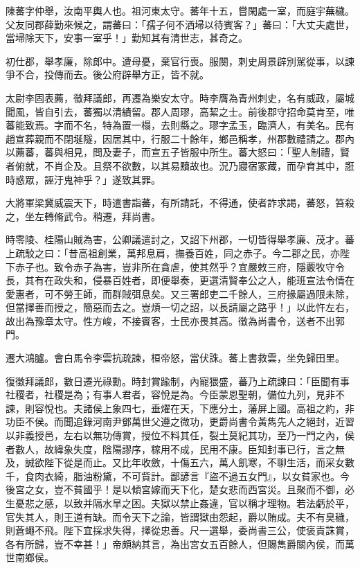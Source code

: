
\begin{pinyinscope}
陳蕃字仲舉，汝南平輿人也。祖河東太守。蕃年十五，嘗閑處一室，而庭宇蕪穢。父友同郡薛勤來候之，謂蕃曰：「孺子何不洒埽以待賓客？」蕃曰：「大丈夫處世，當埽除天下，安事一室乎！」勤知其有清世志，甚奇之。

初仕郡，舉孝廉，除郎中。遭母憂，棄官行喪。服闋，刺史周景辟別駕從事，以諫爭不合，投傳而去。後公府辟舉方正，皆不就。

太尉李固表薦，徵拜議郎，再遷為樂安太守。時李膺為青州刺史，名有威政，屬城聞風，皆自引去，蕃獨以清績留。郡人周璆，高絜之士。前後郡守招命莫肯至，唯蕃能致焉。字而不名，特為置一榻，去則縣之。璆字孟玉，臨濟人，有美名。民有趙宣葬親而不閉埏隧，因居其中，行服二十餘年，鄉邑稱孝，州郡數禮請之。郡內以薦蕃，蕃與相見，問及妻子，而宣五子皆服中所生。蕃大怒曰：「聖人制禮，賢者俯就，不肖企及。且祭不欲數，以其易黷故也。況乃寢宿冢藏，而孕育其中，誑時惑眾，誣汙鬼神乎？」遂致其罪。

大將軍梁冀威震天下，時遣書詣蕃，有所請託，不得通，使者詐求謁，蕃怒，笞殺之，坐左轉脩武令。稍遷，拜尚書。

時零陵、桂陽山賊為害，公卿議遣討之，又詔下州郡，一切皆得舉孝廉、茂才。蕃上疏駮之曰：「昔高祖創業，萬邦息肩，撫養百姓，同之赤子。今二郡之民，亦陛下赤子也。致令赤子為害，豈非所在貪虐，使其然乎？宜嚴敕三府，隱覈牧守令長，其有在政失和，侵暴百姓者，即便舉奏，更選清賢奉公之人，能班宣法令情在愛惠者，可不勞王師，而群賊弭息矣。又三署郎吏二千餘人，三府掾屬過限未除，但當擇善而授之，簡惡而去之。豈煩一切之詔，以長請屬之路乎！」以此忤左右，故出為豫章太守。性方峻，不接賓客，士民亦畏其高。徵為尚書令，送者不出郭門。

遷大鴻臚。會白馬令李雲抗疏諫，桓帝怒，當伏誅。蕃上書救雲，坐免歸田里。

復徵拜議郎，數日遷光祿勳。時封賞踰制，內寵猥盛，蕃乃上疏諫曰：「臣聞有事社稷者，社稷是為；有事人君者，容悅是為。今臣蒙恩聖朝，備位九列，見非不諫，則容悅也。夫諸侯上象四七，垂燿在天，下應分土，藩屏上國。高祖之約，非功臣不侯。而聞追錄河南尹鄧萬世父遵之微功，更爵尚書令黃雋先人之絕封，近習以非義授邑，左右以無功傳賞，授位不料其任，裂土莫紀其功，至乃一門之內，侯者數人，故緯象失度，陰陽謬序，稼用不成，民用不康。臣知封事已行，言之無及，誠欲陛下從是而止。又比年收斂，十傷五六，萬人飢寒，不聊生活，而采女數千，食肉衣綺，脂油粉黛，不可貲計。鄙諺言『盜不過五女門』，以女貧家也。今後宮之女，豈不貧國乎！是以傾宮嫁而天下化，楚女悲而西宮災。且聚而不御，必生憂悲之感，以致并隔水旱之困。夫獄以禁止姦違，官以稱才理物。若法虧於平，官失其人，則王道有缺。而令天下之論，皆謂獄由怨起，爵以賄成。夫不有臭穢，則蒼蠅不飛。陛下宜採求失得，擇從忠善。尺一選舉，委尚書三公，使褒責誅賞，各有所歸，豈不幸甚！」帝頗納其言，為出宮女五百餘人，但賜雋爵關內侯，而萬世南鄉侯。


\end{pinyinscope}
